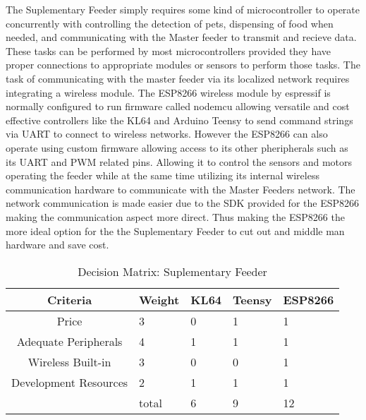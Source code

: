 \documentclass[12pt]{article}
\begin{document}
The Suplementary Feeder simply requires some kind of microcontroller to operate concurrently with controlling the
detection of pets, dispensing of food when needed, and communicating with the Master feeder to transmit and recieve data.
These tasks can be performed by most microcontrollers provided they have proper connections to appropriate modules or sensors
to perform those tasks.  The task of communicating with the master feeder via its localized network requires integrating a 
wireless module.  The ESP8266 wireless module by espressif is normally configured to run firmware called nodemcu allowing 
versatile and cost effective controllers like the KL64 and Arduino Teensy to send command strings via UART to connect to
wireless networks.  However the ESP8266 can also operate using custom firmware allowing access to its other pheripherals 
such as its UART and PWM related pins.  Allowing it to control the sensors and motors operating the feeder while at the
same time utilizing its internal wireless communication hardware to communicate with the Master Feeders network.  The network
communication is made easier due to the SDK provided for the ESP8266 making the communication aspect more direct.  Thus making
the ESP8266 the more ideal option for the the Suplementary Feeder to cut out and middle man hardware and save cost.  

\begin{table}[H]
    \centering
    \caption{Decision Matrix: Suplementary Feeder}
    \label{tab:specs3}
    \begin{tabularx}{\linewidth}{cXXXX} \toprule
        Criteria & Weight & KL64 & Teensy & ESP8266\\ \midrule
        Price                 & 3 & 0 & 1 & 1 \\
        Adequate Peripherals  & 4 & 1 & 1 & 1 \\
        Wireless Built-in     & 3 & 0 & 0 & 1 \\
        Development Resources & 2 & 1 & 1 & 1 \\
        & total                   & 6 & 9 & 12
    \end{tabularx}
\end{table}

\end{document}
